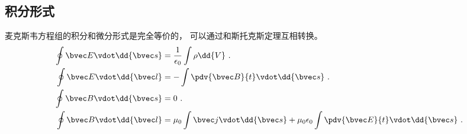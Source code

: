 \subsection{积分形式}
麦克斯韦方程组的积分和微分形式是完全等价的， 可以通过和斯托克斯定理互相转换。
\begin{align}
\oint \bvec E \vdot \dd{\bvec s} &= \frac{1}{\epsilon_0}\int \rho \dd{V}~.\\
\oint \bvec E \vdot \dd{\bvec l} &= -\int \pdv{\bvec B}{t} \vdot \dd{\bvec s}~.\\
\oint \bvec B \vdot \dd{\bvec s} &= 0~.\\
\oint \bvec B \vdot \dd{\bvec l} &= \mu_0 \int \bvec j \vdot \dd{\bvec s} + \mu_0 \epsilon_0 \int \pdv{\bvec E}{t} \vdot \dd{\bvec s}~.
\end{align}
